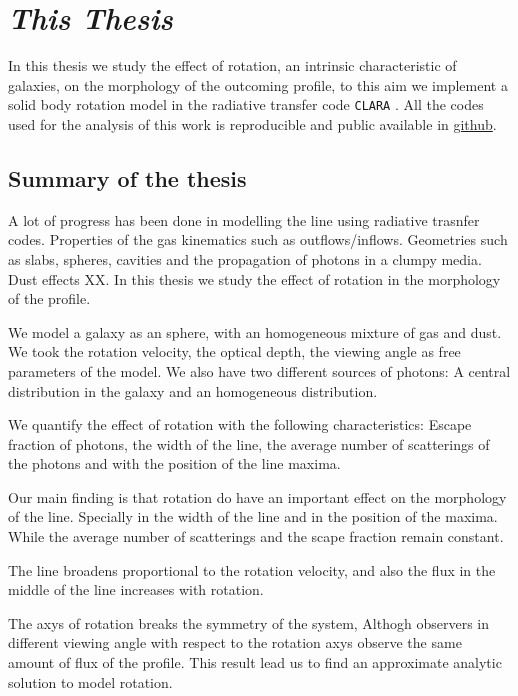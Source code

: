 \section{\emph{This Thesis}}

In this thesis we study the effect of rotation, an intrinsic
 characteristic of galaxies, on the morphology
of the \lya outcoming profile, to this aim we implement a solid body
rotation model in the radiative transfer code \verb+CLARA+ \citep{CLARA}.
All the codes used for the analysis of this work is reproducible
and public available in \href{https://github.com/jngaravitoc/RotationLyAlpha}{github}.

\subsection{Summary of the thesis}

A lot of progress has been done in modelling the \ly line using radiative
trasnfer codes. Properties of the gas kinematics such as outflows/inflows. 
Geometries such as slabs, spheres, cavities and the propagation of \ly photons
in a clumpy media. Dust effects XX. In this thesis we study the effect 
of rotation in the morphology of the \ly profile.  

We model a galaxy as an sphere, with an homogeneous mixture of gas and dust. 
We took the rotation velocity, the optical depth, the viewing angle as free
parameters of the model. We also have two different sources of \ly photons:
A central distribution in the galaxy and an homogeneous distribution. 

We quantify the effect of rotation with the following characteristics: 
Escape fraction of \ly photons, the width of the \ly line, the average number
of scatterings of the \ly photons and with the position of the \ly line maxima.

Our main finding is that rotation do have an important effect on the morphology 
of the \ly line. Specially in the width of the line and in the position of the 
maxima. While the average number of scatterings  and the scape
fraction remain constant.

The line broadens proportional to the rotation velocity, and also the flux in 
the middle of the line increases with rotation.

The axys of rotation breaks the symmetry of the system, Althogh 
observers in different viewing angle with respect to the rotation axys
observe the same amount of flux of the \ly profile. This result
lead us to find an approximate analytic solution to model rotation.
 
